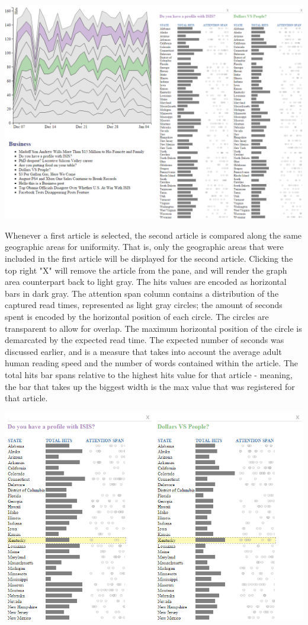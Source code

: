 \documentclass[12pt]{article}
\begin{document}
\noindent\includegraphics[scale=0.5]{img/viz_8}

\noindent Whenever a first article is selected, the second article is compared along the same geographic areas for uniformity. That is, only the geographic areas that were included in the first article will be displayed for the second article. Clicking the top right "X" will remove the article from the pane, and will render the graph area counterpart back to light gray. 
The hits values are encoded as horizontal bars in dark gray. The attention span column contains a distribution of the captured read times, represented as light gray circles; the amount of seconds spent is encoded by the horizontal position of each circle. The circles are transparent to allow for overlap. The maximum horizontal position of the circle is demarcated by the expected read time. The expected number of seconds was discussed earlier, and is a measure that takes into account the average adult human reading speed and the number of words contained within the article. The total hits bar spans relative to the highest hits value for that article - meaning, the bar that takes up the biggest width is the max value that was registered for that article. 

\vfill

\noindent\includegraphics[scale=0.8]{img/viz_9} \\
\end{document}
